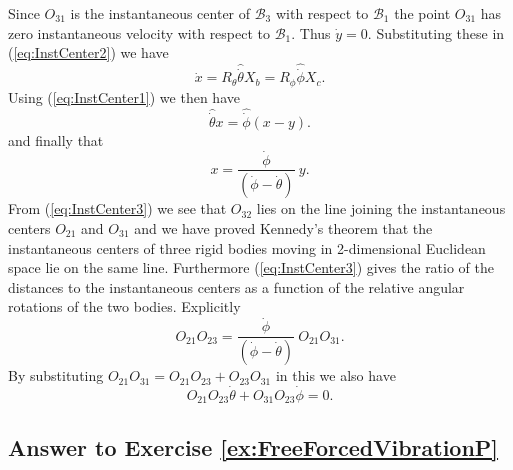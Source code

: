 \documentclass[graybox,envcountchap,sectrefs]{svmonoMuga}
\begin{document}
Since $O_{31}$ is the instantaneous center of $\mathcal{B}_3$ with respect to $\mathcal{B}_1$ the point $O_{31}$ has zero instantaneous velocity with respect to $\mathcal{B}_1$. 
Thus $\dot{y}=0$.  Substituting these in (\ref{eq:InstCenter2}) we have
\begin{equation}\label{eq:InstCenter3}
\dot{x} =R_{\theta}\widehat{\dot{\theta}}X_b=R_{\phi}\widehat{\dot{\phi}}X_c.
\end{equation}
 Using (\ref{eq:InstCenter1}) we then have
\begin{equation}\label{eq:InstCenter2b}
\widehat{\dot{\theta}}x=\widehat{\dot{\phi}}(x-y).
\end{equation}
and finally that
\begin{equation}\label{eq:InstCenter3}
x = \frac{\dot{\phi}}{(\dot{\phi}-\dot{\theta})}\:y.
\end{equation}
From (\ref{eq:InstCenter3}) we see that $O_{32}$ lies on the line joining the instantaneous centers $O_{21}$ and $O_{31}$ and we have proved Kennedy's theorem that the 
instantaneous centers of three rigid bodies moving in 2-dimensional Euclidean space lie on the same line. Furthermore (\ref{eq:InstCenter3}) gives the ratio of the distances to the 
instantaneous centers as a function of the relative angular rotations of the two bodies. Explicitly
\begin{equation}\label{eq:InstCenterRatios0}
O_{21}O_{23} = \frac{\dot{\phi}}{(\dot{\phi}-\dot{\theta})}\:O_{21}O_{31}.
\end{equation}
By substituting $O_{21}O_{31}=O_{21}O_{23}+O_{23}O_{31}$ in this we also have
\begin{equation}\label{eq:InstCenterRatios}
O_{21}O_{23}\dot{\theta} + O_{31}O_{23}\dot{\phi}=0.
\end{equation}




\subsection*{Answer to Exercise \ref{ex:FreeForcedVibrationP}}
\end{document}
